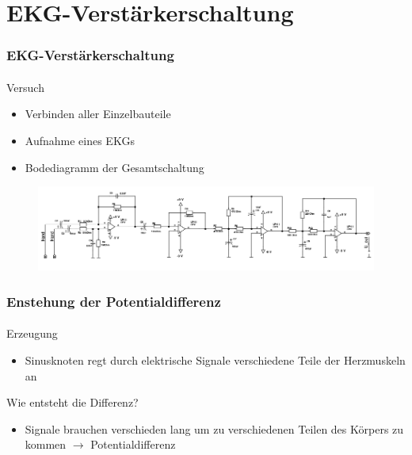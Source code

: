 \section{EKG-Verstärkerschaltung} %
\label{sec:EKG-Verstärkerschaltung}
\begin{frame}
\frametitle{EKG-Verstärkerschaltung}
\framesubtitle{}
    \begin{block}{Versuch}
        \begin{itemize}
            \item Verbinden aller Einzelbauteile
            \item Aufnahme eines EKGs
            \item Bodediagramm der Gesamtschaltung
        \end{itemize}        
    \end{block}
    \begin{figure}[H]
    \begin{center}
            \includegraphics[scale=0.2]{./img/schaltung/alles_zusammen.png}
    \end{center}
    \end{figure}
\end{frame}
\begin{frame}
\frametitle{Enstehung der Potentialdifferenz}
\framesubtitle{}
    \begin{block}{Erzeugung}
         \begin{itemize}
             \item Sinusknoten regt durch elektrische Signale verschiedene
             Teile der Herzmuskeln an
         \end{itemize}
    \end{block}
    \begin{block}{Wie entsteht die Differenz?}
        \begin{itemize}
            \item Signale brauchen verschieden lang um zu verschiedenen Teilen
            des Körpers zu kommen $\rightarrow$ Potentialdifferenz
        \end{itemize}
    \end{block}
\end{frame}
